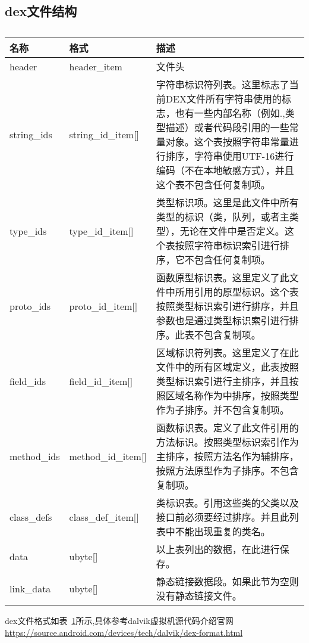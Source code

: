\subsection{dex文件结构}
\begin{table}[H]
\caption{\label{fig:dex}}
\begin{tabular}{|p{1.6cm}|p{2.7cm}|p{8.5cm}|}
\hline
名称 & 格式 & 描述\\
\hline
header & header\_item & 文件头\\
\hline
string\_ids & string\_id\_item[] & 字符串标识符列表。这里标志了当前DEX文件所有字符串使用的标志，也有一些内部名称（例如.,类型描述）或者代码段引用的一些常量对象。这个表按照字符串常量进行排序，字符串使用UTF-16进行编码（不在本地敏感方式），并且这个表不包含任何复制项。\\
\hline
type\_ids & type\_id\_item[] & 类型标识项。这里是此文件中所有类型的标识（类，队列，或者主类型），无论在文件中是否定义。这个表按照字符串标识索引进行排序，它不包含任何复制项。\\
\hline
proto\_ids & proto\_id\_item[] & 函数原型标识表。这里定义了此文件中所用引用的原型标识。这个表按照类型标识索引进行排序，并且参数也是通过类型标识索引进行排序。此表不包含复制项。\\
\hline
field\_ids & field\_id\_item[] & 区域标识符列表。这里定义了在此文件中的所有区域定义，此表按照类型标识索引进行主排序，并且按照区域名称作为中排序，按照类型作为子排序。并不包含复制项。\\
\hline
method\_ids & method\_id\_item[] & 函数标识表。定义了此文件引用的方法标识。按照类型标识索引作为主排序，按照方法名作为辅排序，按照方法原型作为子排序。不包含复制项。\\
\hline
class\_defs & class\_def\_item[] & 类标识表。引用这些类的父类以及接口前必须要经过排序。并且此列表中不能出现重复的类名。\\
\hline
data & ubyte[] & 以上表列出的数据，在此进行保存。\\
\hline
link\_data & ubyte[] & 静态链接数据段。如果此节为空则没有静态链接文件。\\
\hline
\end{tabular}
\end{table}

dex文件格式如表~\ref{fig:dex}所示,具体参考dalvik虚拟机源代码介绍官网\url{https://source.android.com/devices/tech/dalvik/dex-format.html}
